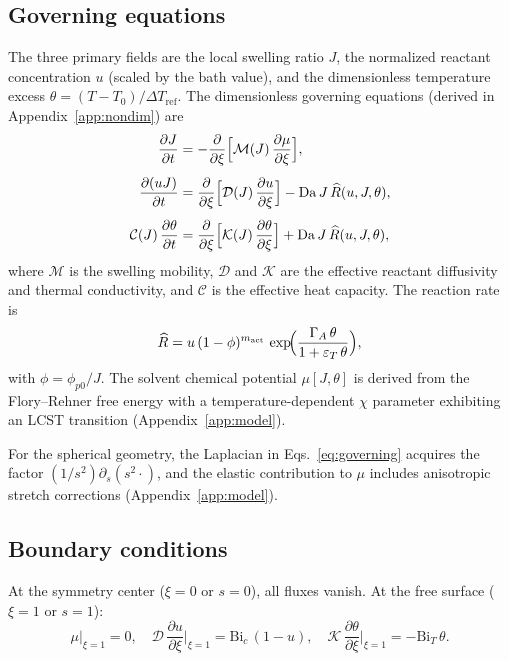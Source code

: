 \documentclass[aps,pre,reprint,superscriptaddress,longbibliography,floatfix]{revtex4-2}
\newcommand{\Ms}{\mathcal{M}}
\newcommand{\Ds}{\mathcal{D}}
\newcommand{\Cs}{\mathcal{C}}
\newcommand{\Ks}{\mathcal{K}}
\newcommand{\Da}{\mathrm{Da}}
\newcommand{\Bi}{\mathrm{Bi}}
\newcommand{\Rhat}{\widehat{R}}
\newcommand{\pp}{\phi_{p0}}
\begin{document}
\subsection{Governing equations}

The three primary fields are the local swelling ratio $J$, the normalized
reactant concentration $u$ (scaled by the bath value), and the
dimensionless temperature excess $\theta=(T-T_0)/\Delta T_\mathrm{ref}$.
The dimensionless governing equations (derived in
Appendix~\ref{app:nondim}) are
\begin{subequations}
\label{eq:governing}
\begin{align}
  \frac{\partial J}{\partial t} &= -\frac{\partial}{\partial \xi}
    \Bigl[\Ms(J)\,\frac{\partial\mu}{\partial\xi}\Bigr], \label{eq:gov_J}\\[4pt]
  \frac{\partial (uJ)}{\partial t} &= \frac{\partial}{\partial\xi}
    \Bigl[\Ds(J)\,\frac{\partial u}{\partial\xi}\Bigr]
    - \Da\,J\,\Rhat(u,J,\theta), \label{eq:gov_u}\\[4pt]
  \Cs(J)\,\frac{\partial\theta}{\partial t} &= \frac{\partial}{\partial\xi}
    \Bigl[\Ks(J)\,\frac{\partial\theta}{\partial\xi}\Bigr]
    + \Da\,J\,\Rhat(u,J,\theta), \label{eq:gov_theta}
\end{align}
\end{subequations}
where $\Ms$ is the swelling mobility, $\Ds$ and $\Ks$ are the effective
reactant diffusivity and thermal conductivity, and $\Cs$ is the effective
heat capacity. The reaction rate is
\begin{equation}
  \Rhat = u\,(1-\phi)^{m_\mathrm{act}}\,
  \exp\!\Bigl(\frac{\Gamma_A\,\theta}{1+\varepsilon_T\,\theta}\Bigr),
  \label{eq:rxn}
\end{equation}
with $\phi = \pp/J$. The solvent chemical potential $\mu[J,\theta]$ is
derived from the Flory--Rehner free energy with a temperature-dependent
$\chi$ parameter exhibiting an LCST transition
(Appendix~\ref{app:model}).

For the spherical geometry, the Laplacian in
Eqs.~\eqref{eq:governing} acquires the factor $(1/s^2)\partial_s(s^2
\cdot)$, and the elastic contribution to $\mu$ includes anisotropic
stretch corrections (Appendix~\ref{app:model}).

\subsection{Boundary conditions}

At the symmetry center ($\xi=0$ or $s=0$), all fluxes vanish. At the
free surface ($\xi=1$ or $s=1$):
\begin{equation}
  \mu\big|_{\xi=1}=0,\quad
  \Ds\,\frac{\partial u}{\partial\xi}\Big|_{\xi=1}=\Bi_c\,(1-u),\quad
  \Ks\,\frac{\partial\theta}{\partial\xi}\Big|_{\xi=1}=-\Bi_T\,\theta.
  \label{eq:bc}
\end{equation}
\end{document}
